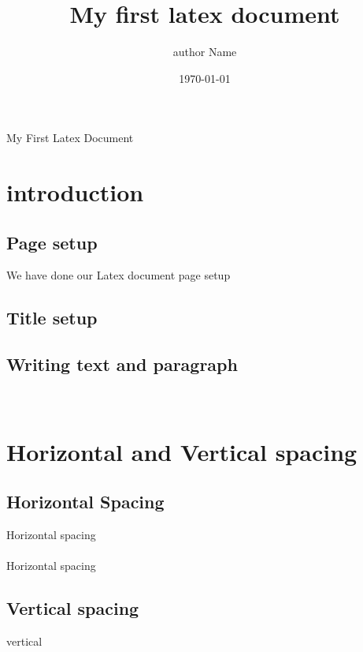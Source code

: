 \documentclass[a4paper, 12pt]{article}
\begin{document}
	\title{My first latex document}
	\author{author Name}
	\date{\today}
	\maketitle
	
	My First Latex Document
	
	\section{introduction}
	
	\subsection{Page setup}
	
	We have done our Latex document page setup
	
	\subsection {Title setup}
	
	\subsection{Writing text and paragraph}
	
	\blindtext \\
	\newline
	
	
	\blindtext
	
	\clearpage
	
	\section{Horizontal and Vertical spacing}
	\subsection{Horizontal Spacing}
	
	Horizontal \hspace{2in} spacing \\
	\\
	Horizontal \hfill spacing
	
	\subsection{Vertical spacing}
	vertical
	\vfill
	
\end{document}
